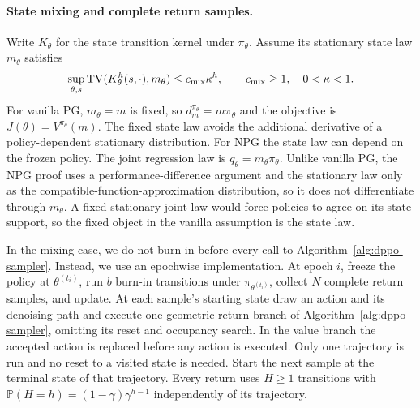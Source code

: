 \paragraph{State mixing and complete return samples.}
Write $K_\theta$ for the state transition kernel under $\pi_\theta$.
Assume its stationary state law $m_\theta$ satisfies
\[
 \sup_{\theta,s}\operatorname{TV}(K_\theta^h(s,\cdot),m_\theta)
 \leq c_{\rm mix}\kappa^h,\qquad c_{\rm mix}\geq1,\quad0<\kappa<1.
\]
For vanilla PG, $m_\theta=m$ is fixed, so
$d_m^{\pi_\theta}=m\pi_\theta$ and the objective is
$J(\theta)=V^{\pi_\theta}(m)$. The fixed state law avoids the additional derivative of a policy-dependent stationary distribution. For NPG the state law can depend on the
frozen policy. The joint regression law is $q_\theta=m_\theta\pi_\theta$. Unlike vanilla PG, the NPG proof uses a performance-difference argument and the stationary law only as the compatible-function-approximation distribution, so it does not differentiate through $m_\theta$.
A fixed stationary joint law would force policies to agree on its state
support, so the fixed object in the vanilla assumption is the state law.

In the mixing case, we do not burn in before every call to Algorithm~\ref{alg:dppo-sampler}. Instead, we use an epochwise implementation. At epoch $i$, freeze the policy at $\theta^{(t_i)}$, run $b$ burn-in transitions under $\pi_{\theta^{(t_i)}}$, collect $N$ complete return samples, and update. At each
sample's starting state draw an action and its denoising path and execute
one geometric-return branch of Algorithm~\ref{alg:dppo-sampler}, omitting
its reset and occupancy search. In the value branch the accepted action
is replaced before any action is executed. Only one trajectory is run and
no reset to a visited state is needed. Start the next sample at the terminal
state of that trajectory. Every return uses $H\geq1$ transitions with
$\mathbb{P}(H=h)=(1-\gamma)\gamma^{h-1}$ independently of its trajectory.

